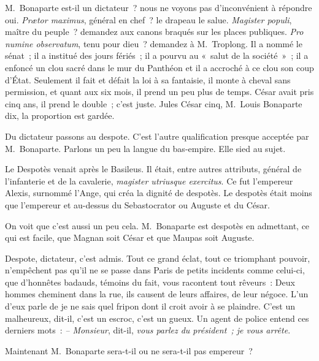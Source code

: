 \documentclass[french,twoside]{book} %
\begin{document}
M. Bonaparte est-il un dictateur ? nous ne voyons pas d’inconvénient à répondre oui. \emph{Prætor maximus}, général en chef ? le drapeau le salue. \emph{Magister populi}, maître du peuple ? demandez aux canons braqués sur les places publiques. \emph{Pro numine observatum}, tenu pour dieu ? demandez à M. Troplong. Il a nommé le sénat ; il a institué des jours fériés ; il a pourvu au « salut de la société » ; il a enfoncé un clou sacré dans le mur du Panthéon et il a accroché à ce clou son coup d’État. Seulement il fait et défait la loi à sa fantaisie, il monte à cheval sans permission, et quant aux six mois, il prend un peu plus de temps. César avait pris cinq ans, il prend le double ; c’est juste. Jules César cinq, M. Louis Bonaparte dix, la proportion est gardée.\par
Du dictateur passons au despote. C’est l’autre qualification presque acceptée par M. Bonaparte. Parlons un peu la langue du bas-empire. Elle sied au sujet.\par
Le Despotès venait après le Basileus. Il était, entre autres attributs, général de l’infanterie et de la cavalerie, \emph{magister utriusque exercitus}. Ce fut l’empereur Alexis, surnommé l’Ange, qui créa la dignité de despotès. Le despotès était moins que l’empereur et au-dessus du Sebastocrator ou Auguste et du César.\par
On voit que c’est aussi un peu cela. M. Bonaparte est despotès en admettant, ce qui est facile, que Magnan soit César et que Maupas soit Auguste.\par
Despote, dictateur, c’est admis. Tout ce grand éclat, tout ce triomphant pouvoir, n’empêchent pas qu’il ne se passe dans Paris de petits incidents comme celui-ci, que d’honnêtes badauds, témoins du fait, vous racontent tout rêveurs : Deux hommes cheminent dans la rue, ils causent de leurs affaires, de leur négoce. L’un d’eux parle de je ne sais quel fripon dont il croit avoir à se plaindre. C’est un malheureux, dit-il, c’est un escroc, c’est un gueux. Un agent de police entend ces derniers mots : \emph{– Monsieur}, dit-il, \emph{vous parlez du président ; je vous arrête}.\par
Maintenant M. Bonaparte sera-t-il ou ne sera-t-il pas empereur ?\par
\end{document}
